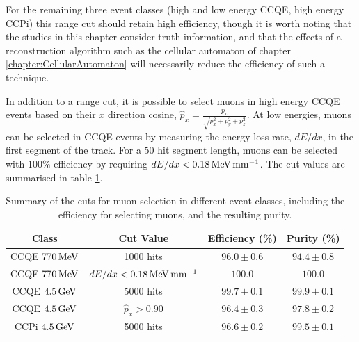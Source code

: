 For the remaining three event classes (high and low energy \acs{CCQE}, high energy \acs{CCPi}) this range cut should retain high efficiency, though it is worth noting that the studies in this chapter consider truth information, and that the effects of a reconstruction algorithm such as the cellular automaton of chapter \ref{chapter:CellularAutomaton} will necessarily reduce the efficiency of such a technique.

In addition to a range cut, it is possible to select muons in high energy \acs{CCQE} events based on their $x$ direction cosine, $\displaystyle \hat{p}_x = \frac{p_x}{\sqrt{p_x^2 + p_y^2 + p_z^2}}$. At low energies, muons can be selected in \acs{CCQE} events by measuring the energy loss rate, $dE/dx$, in the first segment of the track. For a $50$ hit segment length, muons can be selected with $100\%$ efficiency by requiring $dE/dx < 0.18 \,\mathrm{MeV} \,\mathrm{mm}^{-1}$. The cut values are summarised in table \ref{table:summary_cuts}.

\begin{table}
\centering
\begin{tabular}{cccc}
    Class & Cut Value & Efficiency (\%) & Purity (\%) \\
\hline
\hline
\acs{CCQE} $770\,\mathrm{MeV}$ & 1000 hits & $96.0\pm0.6$ & $94.4\pm0.8$ \\
\acs{CCQE} $770\,\mathrm{MeV}$ & $dE/dx < 0.18 \,\mathrm{MeV} \,\mathrm{mm}^{-1}$ & $100.0$ & $100.0$ \\
\acs{CCQE} $4.5\,\mathrm{GeV}$ & 5000 hits & $99.7\pm0.1$ & $99.9\pm0.1$ \\
\acs{CCQE} $4.5\,\mathrm{GeV}$ & $\hat{p}_x > 0.90$ & $96.4\pm0.3$ & $97.8\pm0.2$ \\
\acs{CCPi} $4.5\,\mathrm{GeV}$ & 5000 hits & $96.6\pm0.2$ & $99.5\pm0.1$ \\
\hline 
\end{tabular}
\caption[Summary of cuts with efficiencies and purities]{\label{table:summary_cuts}Summary of the cuts for muon selection in different event classes, including the efficiency for selecting muons, and the resulting purity.}
\end{table}

